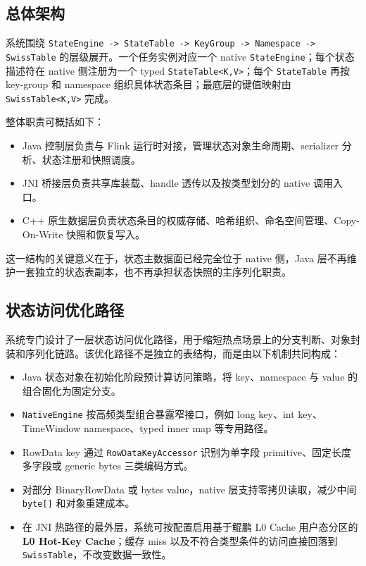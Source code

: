 \documentclass[a4paper,11pt]{article}
\begin{document}
\subsection{总体架构}

系统围绕 \texttt{StateEngine -> StateTable -> KeyGroup -> Namespace -> SwissTable} 的层级展开。一个任务实例对应一个 native \texttt{StateEngine}；每个状态描述符在 native 侧注册为一个 typed \texttt{StateTable<K,V>}；每个 \texttt{StateTable} 再按 key-group 和 namespace 组织具体状态条目；最底层的键值映射由 \texttt{SwissTable<K,V>} 完成。

整体职责可概括如下：

\begin{itemize}
  \item Java 控制层负责与 Flink 运行时对接，管理状态对象生命周期、serializer 分析、状态注册和快照调度。
  \item JNI 桥接层负责共享库装载、handle 透传以及按类型划分的 native 调用入口。
  \item C++ 原生数据层负责状态条目的权威存储、哈希组织、命名空间管理、Copy-On-Write 快照和恢复写入。
\end{itemize}

这一结构的关键意义在于，状态主数据面已经完全位于 native 侧，Java 层不再维护一套独立的状态表副本，也不再承担状态快照的主序列化职责。

\subsection{状态访问优化路径}

系统专门设计了一层状态访问优化路径，用于缩短热点场景上的分支判断、对象封装和序列化链路。该优化路径不是独立的表结构，而是由以下机制共同构成：

\begin{itemize}
  \item Java 状态对象在初始化阶段预计算访问策略，将 key、namespace 与 value 的组合固化为固定分支。
  \item \texttt{NativeEngine} 按高频类型组合暴露窄接口，例如 long key、int key、TimeWindow namespace、typed inner map 等专用路径。
  \item RowData key 通过 \texttt{RowDataKeyAccessor} 识别为单字段 primitive、固定长度多字段或 generic bytes 三类编码方式。
  \item 对部分 BinaryRowData 或 bytes value，native 层支持零拷贝读取，减少中间 \texttt{byte[]} 和对象重建成本。
  \item 在 JNI 热路径的最外层，系统可按配置启用基于鲲鹏 L0 Cache 用户态分区的\textbf{L0 Hot-Key Cache}；缓存 miss 以及不符合类型条件的访问直接回落到 \texttt{SwissTable}，不改变数据一致性。
\end{itemize}
\end{document}
